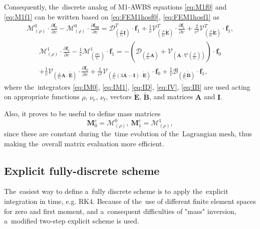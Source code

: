 \documentclass[review]{elsarticle}
\newcommand{\pdv}[2]{\frac{\partial{#1}}{\partial{#2}}}
\newcommand{\vect}[1]{\boldsymbol{#1}}
\newcommand{\matr}[1]{\mathbf{#1}}
\newcommand{\nue}{\nu_{e}}
\newcommand{\nutot}{\nu_{t}}
\newcommand{\vmag}{v}
\newcommand{\tE}{\vect{\tilde{E}}}
\newcommand{\tB}{\vect{\tilde{B}}}
\newcommand{\fM}{f_M}
\newcommand{\vfzero}{\vect{f}_0}
\newcommand{\fone}{\vect{f}_1}
\newcommand{\MI}{\matr{I}}
\newcommand{\MA}{\matr{A}}
\newcommand{\IM}{\boldsymbol{\mathcal{M}}}
\newcommand{\ID}{\boldsymbol{\mathcal{D}}}
\newcommand{\IV}{\boldsymbol{\mathcal{V}}}
\newcommand{\IB}{\boldsymbol{\mathcal{B}}}
\begin{document}
Consequently, the~discrete analog of M1-AWBS equations
\eqref{eq:M1f0} and \eqref{eq:M1f1} can be written based on 
 \eqref{eq:FEM1hosf0}, \eqref{eq:FEM1hosf1} as
\begin{multline}
  \IM^0_{(\rho)} \cdot \pdv{\vfzero}{\vmag} 
  - \IM^0_{(\rho)} \cdot \pdv{\vect{\fM}}{\vmag}
  = 
  \ID^T_{\left(\frac{\rho}{\nue}\MI\right)} \cdot \fone
  + \frac{1}{\vmag}\IV^T_{\left(\frac{\rho}{\nue}\tE\right)} \cdot 
  \pdv{\fone}{\vmag} 
  + \frac{2}{\vmag^2}\IV^T_{\left(\frac{\rho}{\nue}\tE\right)} \cdot \fone ,  
  \label{eq:semiM1hosf0}
\end{multline}
\begin{multline}
  \IM^1_{(\rho)} \cdot \pdv{\fone}{\vmag} 
  - \frac{1}{\vmag}\IM^1_{\left( \frac{\rho \nutot}{\nue} \right)} 
  \cdot \fone 
  = 
  - \left(\ID_{\left(\frac{\rho}{\nue}\MA\right)}  
  + \IV_{\left( \MA \cdot \nabla\left(\frac{\rho}{\nue}\right) \right)}\right) 
  \cdot \vfzero \\ 
  + \frac{1}{\vmag}\IV_{\left(\frac{\rho}{\nue}\MA \cdot \tE\right)} \cdot
  \pdv{\vfzero}{\vmag}
  + \frac{1}{\vmag^2}\IV_{\left(\frac{\rho}{\nue} 
  \left( 3\MA - \MI \right) \cdot \tE \right)} \cdot \vfzero
  + \frac{1}{\vmag}\IB_{\left( \frac{\rho}{\nue}\tB \right)} \cdot \fone ,
  \label{eq:semiM1hosf1}
\end{multline}
where the~integrators \eqref{eq:IM0}, \eqref{eq:IM1},
\eqref{eq:ID}, \eqref{eq:IV}, \eqref{eq:IB} are used acting on appropriate
functions $\rho$, $\nue$, $\nutot$, vectors $\tE$, $\tB$, and matrices $\MA$
and $\MI$.

Also, it proves to be useful to define mass matrices
\begin{equation}
  \matr{M}_0^c = \IM^0_{(\rho)},~\matr{M}_1^c = \IM^1_{(\rho)} ,
  \label{eq:massmatrices} 
\end{equation}
since these are constant during the~time evolution of the~Lagrangian mesh,
thus making the~overall matrix evaluation more efficient.

\subsection{Explicit fully-discrete scheme}\label{sec:expl_fullydiscrete_scheme}
The~easiest way to define a~fully discrete scheme is to apply the~explicit
integration in time, e.g. RK4.
Because of the~use of different finite element spaces for zero and first moment,
and a~consequent difficulties of "mass" inversion, a~modified two-step explicit
scheme is used.
\end{document}
